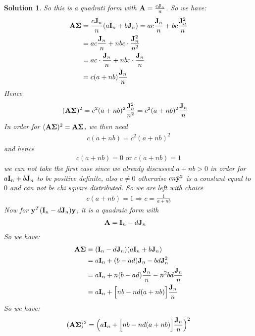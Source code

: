 \documentclass[11pt]{article}
\newtheorem{sol}{Solution}
\begin{document}
\begin{sol}
	So this is a quadrati form with ${\bf A} = \frac{c{\bf J}_n}{n}$.\vskip 2mm
	So we have:
	\begin{align*}
		{\bf A}{\bf \Sigma} &= \frac{c{\bf J}_n}{n} (a {\bf I}_n + b{\bf J}_n) = ac\frac{{\bf J}_n}{n} + bc\frac{{\bf J}_n^2}{n}\\
		&= ac\frac{{\bf J}_n}{n} + nbc \cdot \frac{{\bf J}_n^2}{n^2}\\
		&= ac\cdot \frac{{\bf J}_n}{n} + nbc\cdot \frac{{\bf J}_n}{n}\\
		&= c(a + nb)\frac{{\bf J}_n}{n}
	\end{align*}
	Hence
	\begin{align*}
		({\bf A}{\bf \Sigma})^2 &= c^2(a + nb)^2\frac{{\bf J}_n^2}{n^2} = c^2(a + nb)^2\frac{{\bf J}_n}{n}
	\end{align*}
	In order for $({\bf A}{\bf \Sigma})^2 = {\bf A}{\bf \Sigma}$, we then need 
	\begin{align*}
		c(a + nb) = c^2(a + nb)^2
	\end{align*}
	and hence 
	\begin{align*}
		c(a + nb) = 0 \text{ or } c(a + nb) = 1
	\end{align*}
	we can not take the first case since we already discussed $a + nb > 0$ in order for $a{\bf I}_n + b{\bf J}_n$ to be positive definite, also $c \neq 0$ otherwise $cn\bar{{\bf y}}^2$ is a constant equal to $0$ and can not be chi square distributed.\vskip 2mm
	So we are left with choice 
	\begin{align*}
		c (a + nb) = 1 \Longrightarrow c = \frac{1}{a + nb}
	\end{align*}
	Now for ${\bf y}^T({\bf I}_n - d{\bf J}_n){\bf y}$, it is a quadraic form with
	\begin{align*}
		{\bf A} &= {\bf I}_n - d{\bf J}_n
	\end{align*}
	So we have:
	\begin{align*}
		{\bf A}{\bf \Sigma} &= ({\bf I}_n - d{\bf J}_n)(a{\bf I}_n + b{\bf J}_n)\\
						&= a{\bf I}_n + (b - ad){\bf J}_n - bd{\bf J}_n^2\\
						&= a{\bf I}_n + n(b - ad)\frac{{\bf J}_n}{n} - n^2bd \frac{{\bf J}_n}{n}\\
						&= a{\bf I}_n + \Big[nb - nd(a + nb)\Big]\frac{{\bf J}_n}{n}
	\end{align*}
	So we have:
	\begin{align*}
		({\bf A}{\bf \Sigma})^2 &= \Big(a{\bf I}_n + \Big[nb - nd(a + nb)\Big]\frac{{\bf J}_n}{n}\Big)^2\\

\end{align*}
\end{sol}
\end{document}
